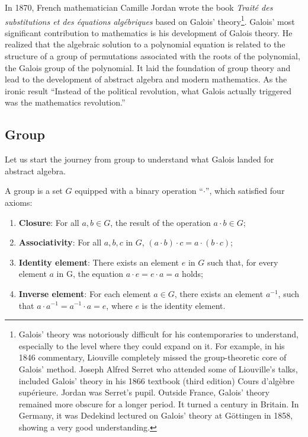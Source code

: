 \documentclass[b5paper]{article}
\begin{document}
In 1870, French mathematician Camille Jordan wrote the book {\em Traité des substitutions et des équations algébriques} based on Galois' theory\footnote{Galois' theory was notoriously difficult for his contemporaries to understand, especially to the level where they could expand on it. For example, in his 1846 commentary, Liouville completely missed the group-theoretic core of Galois' method. Joseph Alfred Serret who attended some of Liouville's talks, included Galois' theory in his 1866 textbook (third edition) Cours d'algèbre supérieure. Jordan was Serret's pupil. Outside France, Galois' theory remained more obscure for a longer period. It turned a century in Britain. In Germany, it was Dedekind lectured on Galois' theory at Göttingen in 1858, showing a very good understanding.}. Galois' most significant contribution to mathematics is his development of Galois theory. He realized that the algebraic solution to a polynomial equation is related to the structure of a group of permutations associated with the roots of the polynomial, the Galois group of the polynomial. It laid the foundation of group theory and lead to the development of abstract algebra and modern mathematics. As the ironic result ``Instead of the political revolution, what Galois actually triggered was the mathematics revolution\cite{StepanovRose15}.''

\subsection{Group}

Let us start the journey from group to understand what Galois landed for abstract algebra.

\begin{definition} A group is a set $G$ equipped with a binary operation ``$\cdot$'', which satisfied four axioms:

\begin{enumerate}
\item \textbf{Closure}: For all $a, b \in G$, the result of the operation $a \cdot b \in G$;
\item \textbf{Associativity}: For all $a, b, c$ in $G$, $(a \cdot b) \cdot c = a \cdot (b \cdot c)$;
\item \textbf{Identity element}: There exists an element $e$ in $G$ such that, for every element $a$ in G, the equation $a \cdot e = e \cdot a = a$ holds;
\item \textbf{Inverse element}: For each element $a \in G$, there exists an element $a^{-1}$, such that $a \cdot a^{-1} = a^{-1} \cdot a = e$, where $e$ is the identity element.
\end{enumerate}
\end{definition}
\end{document}
